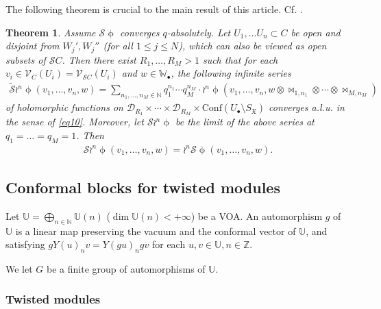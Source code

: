 \documentclass[11pt,b5paper,notitlepage]{article}
\theoremstyle{definition}
\theoremstyle{plain}
\newtheorem{thm}[df]{Theorem}
\newcommand{\fk}{\mathfrak}
\newcommand{\mc}{\mathcal}
\newcommand{\wtd}{\widetilde}
\newcommand{\Conf}{\mathrm{Conf}}
\newcommand{\scr}{\mathscr}
\newcommand{\SX}{{S_{\fk X}}}
\newcommand{\blt}{\bullet}
\newcommand{\Ubb}{\mathbb U}
\newcommand{\Wbb}{\mathbb W}
\newcommand{\Nbb}{\mathbb N}
\newcommand{\Zbb}{\mathbb Z}
\numberwithin{equation}{subsection}
\begin{document}
The following theorem is crucial to the main result of this article. Cf. \cite[Thm. 9.1]{Gui24b}.

\begin{thm}\label{lb19}
Assume $\scr S\upphi$ converges $q$-absolutely. Let $U_1,\dots U_n\subset C$ be open and disjoint from $W_j',W_j''$ (for all $1\leq j\leq N$), which can also be viewed as open subsets of $\scr SC$. Then there exist $R_1,\dots,R_M>1$ such that for each $v_i\in\scr V_C(U_i)=\scr V_{\scr SC}(U_i)$ and $w\in\Wbb_\blt$, the following infinite series
\begin{align*}
\wtd{\mc S}\wr^n\upphi(v_1,\dots,v_n,w)=\sum_{n_1,\dots,n_M\in\Nbb}q_1^{n_1}\cdots q_M^{n_M}\cdot\wr^n\upphi(v_1,\dots,v_n,w\otimes\bowtie_{1,n_1}\otimes\cdots\otimes\bowtie_{M,n_M})	
\end{align*}
of holomorphic functions on $\mc D_{R_1}\times\cdots\times\mc D_{R_M}\times\Conf(U_\blt\setminus\SX)$ converges a.l.u. in the sense of \eqref{eq10}. Moreover, let $\scr S\wr^n\upphi$ be the limit of the above series at $q_1=\dots=q_M=1$.  Then
\begin{align}
\scr S\wr^n\upphi(v_1,\dots,v_n,w)=\wr^n\scr S\upphi(v_1,\dots,v_n,w).	
\end{align}
\end{thm}



\subsection{Conformal blocks for twisted modules}\label{lb22}


Let $\Ubb=\bigoplus_{n\in\Nbb}\Ubb(n)$ ($\dim\Ubb(n)<+\infty$) be a  VOA. An automorphism $g$ of $\Ubb$ is a linear map preserving the vacuum and the conformal vector of $\Ubb$, and satisfying $gY(u)_nv=Y(gu)_ngv$ for each $u,v\in\Ubb,n\in\Zbb$.

We let $G$ be a finite group of automorphisms of $\Ubb$.


\subsubsection{Twisted modules}\label{lb34}
\end{document}
